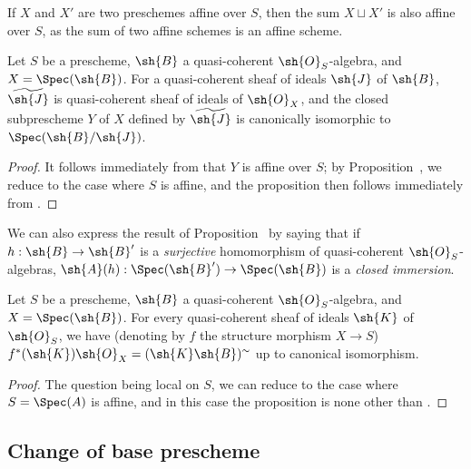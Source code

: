 \begin{remark}[1.4.9]
\label{2.1.4.9}
If $X$ and $X'$ are two preschemes affine over $S$, then the sum $X\sqcup X'$ is also affine over $S$, as the sum of two affine schemes is an affine scheme.
\end{remark}

\begin{proposition}[1.4.10]
\label{2.1.4.10}
Let $S$ be a prescheme, $\sh{B}$ a quasi-coherent $\sh{O}_S$-algebra, and $X=\Spec(\sh{B})$.
For a quasi-coherent sheaf of ideals $\sh{J}$ of $\sh{B}$, $\widetilde{\sh{J}}$ is quasi-coherent sheaf of ideals of $\sh{O}_X$, and the closed subprescheme $Y$ of $X$ defined by $\widetilde{\sh{J}}$ is canonically isomorphic to $\Spec(\sh{B}/\sh{J})$.
\end{proposition}

\begin{proof}
\label{proof-2.1.4.10}
It follows immediately from  that $Y$ is affine over $S$; by Proposition~, we reduce to the case where $S$ is affine, and the proposition then follows immediately from .
\end{proof}

We can also express the result of Proposition~ by saying that if $h:\sh{B}\to\sh{B}'$ is a \emph{surjective} homomorphism of quasi-coherent $\sh{O}_S$-algebras, $\sh{A}(h):\Spec(\sh{B}')\to\Spec(\sh{B})$ is a \emph{closed immersion}.

\begin{proposition}[1.4.11]
\label{2.1.4.11}
Let $S$ be a prescheme, $\sh{B}$ a quasi-coherent $\sh{O}_S$-algebra, and $X=\Spec(\sh{B})$.
For every quasi-coherent sheaf of ideals $\sh{K}$ of $\sh{O}_S$, we have (denoting by $f$ the structure morphism $X\to S$) $f^*(\sh{K})\sh{O}_X=(\sh{K}\sh{B})^\sim$ up to canonical isomorphism.
\end{proposition}

\begin{proof}
\label{proof-2.1.4.11}
The question being local on $S$, we can reduce to the case where $S=\Spec(A)$ is affine, and in this case the proposition is none other than .
\end{proof}

\subsection{Change of base prescheme}
\label{subsection:2.1.5}

